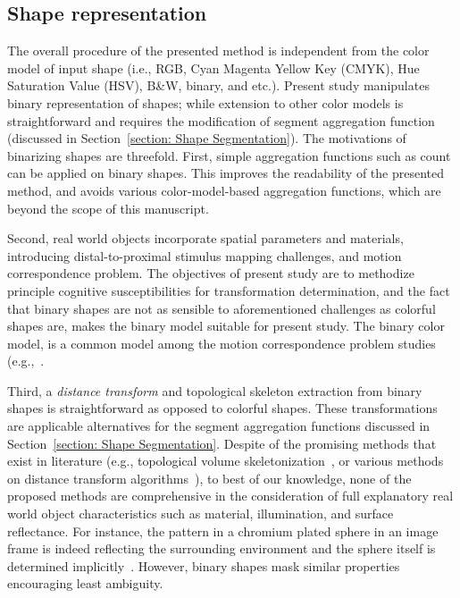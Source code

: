 \subsection{Shape representation} \label{section: Shapre Representation}
The overall procedure of the presented method is independent from the color model of input shape (i.e., RGB, Cyan Magenta Yellow Key (CMYK), Hue Saturation Value (HSV), B\&W, binary, and etc.).%
Present study manipulates binary representation of shapes; while extension to other color models is straightforward and requires the modification of segment aggregation function (discussed in Section~\ref{section: Shape Segmentation}). The motivations of binarizing shapes are threefold. First, simple aggregation functions such as count can be applied on binary shapes. This improves the readability of the presented method, and avoids various color-model-based aggregation functions, which are beyond the scope of this manuscript.

Second, real world objects incorporate spatial parameters and materials, introducing distal-to-proximal stimulus mapping challenges, and motion correspondence problem. The objectives of present study are to methodize principle cognitive susceptibilities for transformation determination, and the fact that binary shapes are not as sensible to aforementioned challenges as colorful shapes are, makes the binary model suitable for present study. The binary color model, is a common model among the motion correspondence problem studies (e.g.,~\cite{girod2013principles,hirschmuller2009evaluation}.

Third, a \textit{distance transform} and topological skeleton extraction from binary shapes is straightforward as opposed to colorful shapes. These transformations are applicable alternatives for the segment aggregation functions discussed in Section~\ref{section: Shape Segmentation}. Despite of the promising methods that exist in literature (e.g., topological volume skeletonization~\cite{takahashi2004topological}, or various methods on distance transform algorithms~\cite{fabbri20082d}), to best of our knowledge, none of the proposed methods are comprehensive in the consideration of full explanatory real world object characteristics such as material, illumination, and surface reflectance. For instance, the pattern in a chro\-mium plated sphere in an image frame is indeed reflecting the surrounding environment and the sphere itself is determined implicitly~\cite{adelson2001seeing}. However, binary shapes mask similar properties encouraging least ambiguity.

